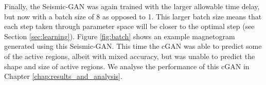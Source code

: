 \documentclass[11pt,a4paper,onecolumn]{report}
\begin{document}

Finally, the Seismic-GAN was again trained with the larger allowable time delay,
but now with a batch size of 8 as opposed to 1. This larger batch size means
that each step taken through parameter space will be closer to the optimal step
(see Section \ref{sec:learning}). Figure \ref{fig:batch} shows an example
magnetogram generated using this Seismic-GAN. This time the cGAN was able to
predict some of the active regions, albeit with mixed accuracy, but was unable
to predict the shape and size of active regions. We analyse the performance of
this cGAN in Chapter \ref{chap:results_and_analysis}.
\end{document}
